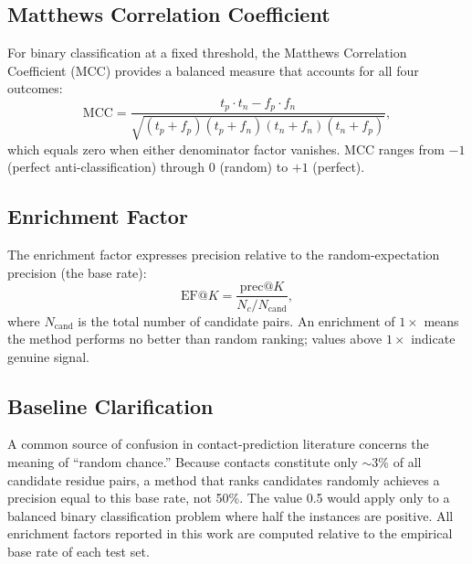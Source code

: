 \subsection{Matthews Correlation Coefficient}
For binary classification at a fixed threshold, the Matthews Correlation
Coefficient (MCC) provides a balanced measure that accounts for all four
outcomes:
\begin{equation}
	\mathrm{MCC} =
	\frac{t_p \cdot t_n - f_p \cdot f_n}
	{\sqrt{(t_p{+}f_p)(t_p{+}f_n)(t_n{+}f_n)(t_n{+}f_p)}},
	\label{eq:mcc}
\end{equation}
which equals zero when either denominator factor vanishes.  MCC ranges from
$-1$ (perfect anti-classification) through 0 (random) to $+1$ (perfect).

\subsection{Enrichment Factor}
The enrichment factor expresses precision relative to the random-expectation
precision (the base rate):
\begin{equation}
	\mathrm{EF}@K = \frac{\mathrm{prec}@K}{N_c / N_{\mathrm{cand}}},
	\label{eq:enrichment}
\end{equation}
where $N_{\mathrm{cand}}$ is the total number of candidate pairs.  An
enrichment of $1\times$ means the method performs no better than random
ranking; values above $1\times$ indicate genuine signal.

\subsection{Baseline Clarification}
A common source of confusion in contact-prediction literature concerns the
meaning of ``random chance.''  Because contacts constitute only $\sim$3\% of
all candidate residue pairs, a method that ranks candidates randomly achieves
a precision equal to this base rate, not 50\%.  The value 0.5 would apply only
to a balanced binary classification problem where half the instances are
positive.  All enrichment factors reported in this work are computed relative
to the empirical base rate of each test set.
